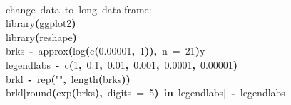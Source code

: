 \documentclass[a4paper]{article}
\newcommand{\hlnumber}[1]{\textcolor[rgb]{0.0823529411764706,0.0784313725490196,0.709803921568627}{#1}}%
\newcommand{\hlfunctioncall}[1]{\textcolor[rgb]{1,0,0}{#1}}%
\newcommand{\hlstring}[1]{\textcolor[rgb]{0.6,0.6,1}{#1}}%
\newcommand{\hlkeyword}[1]{\textcolor[rgb]{0,0,0}{\textbf{#1}}}%
\newcommand{\hlargument}[1]{\textcolor[rgb]{0.694117647058824,0.247058823529412,0.0196078431372549}{#1}}%
\newcommand{\hlcomment}[1]{\textcolor[rgb]{0.8,0.8,0.8}{#1}}%
\newcommand{\hlassignement}[1]{\textcolor[rgb]{0.215686274509804,0.215686274509804,0.384313725490196}{\textbf{#1}}}%
\newcommand{\hlsymbol}[1]{\textcolor[rgb]{0,0,0}{#1}}%
\newcommand{\hlprompt}[1]{\textcolor[rgb]{0,0,0}{#1}}%
\newcommand{\hlstd}[1]{\textcolor[rgb]{0,0,0}{#1}}%
\newenvironment{Houtput}{\raggedright}{%
%
}
\begin{document}
\begin{Houtput}
\hspace*{\fill}\\
\hlstd{}\ttfamily\noindent
\hlprompt{\usebox{\hlnormalsizeboxgreaterthan}{\ }}\hlcomment{\usebox{\hlnormalsizeboxhash}{\ }change{\ }data{\ }to{\ }long{\ }data.frame:}\mbox{}
\normalfont
\hspace*{\fill}\\
\hlstd{}\ttfamily\noindent
\hlprompt{\usebox{\hlnormalsizeboxgreaterthan}{\ }}\hlfunctioncall{library}\hlkeyword{(}\hlsymbol{ggplot2}\hlkeyword{)}\mbox{}
\normalfont
\hspace*{\fill}\\
\hlstd{}\ttfamily\noindent
\hlprompt{\usebox{\hlnormalsizeboxgreaterthan}{\ }}\hlfunctioncall{library}\hlkeyword{(}\hlsymbol{reshape}\hlkeyword{)}\mbox{}
\normalfont
\hspace*{\fill}\\
\hlstd{}\ttfamily\noindent
\hlprompt{\usebox{\hlnormalsizeboxgreaterthan}{\ }}\hlsymbol{brks}{\ }\hlassignement{\usebox{\hlnormalsizeboxlessthan}-}{\ }\hlfunctioncall{approx}\hlkeyword{(}\hlfunctioncall{log}\hlkeyword{(}\hlfunctioncall{c}\hlkeyword{(}\hlnumber{0.00001}\hlkeyword{,}{\ }\hlnumber{1}\hlkeyword{)}\hlkeyword{)}\hlkeyword{,}{\ }\hlargument{n}{\ }\hlargument{=}{\ }\hlnumber{21}\hlkeyword{)}\hlkeyword{\usebox{\hlnormalsizeboxdollar}}\hlsymbol{y}\mbox{}
\normalfont
\hspace*{\fill}\\
\hlstd{}\ttfamily\noindent
\hlprompt{\usebox{\hlnormalsizeboxgreaterthan}{\ }}\hlsymbol{legendlabs}{\ }\hlassignement{\usebox{\hlnormalsizeboxlessthan}-}{\ }\hlfunctioncall{c}\hlkeyword{(}\hlnumber{1}\hlkeyword{,}{\ }\hlnumber{0.1}\hlkeyword{,}{\ }\hlnumber{0.01}\hlkeyword{,}{\ }\hlnumber{0.001}\hlkeyword{,}{\ }\hlnumber{0.0001}\hlkeyword{,}{\ }\hlnumber{0.00001}\hlkeyword{)}\mbox{}
\normalfont
\hspace*{\fill}\\
\hlstd{}\ttfamily\noindent
\hlprompt{\usebox{\hlnormalsizeboxgreaterthan}{\ }}\hlsymbol{brkl}{\ }\hlassignement{\usebox{\hlnormalsizeboxlessthan}-}{\ }\hlfunctioncall{rep}\hlkeyword{(}\hlstring{""}\hlkeyword{,}{\ }\hlfunctioncall{length}\hlkeyword{(}\hlsymbol{brks}\hlkeyword{)}\hlkeyword{)}\mbox{}
\normalfont
\hspace*{\fill}\\
\hlstd{}\ttfamily\noindent
\hlprompt{\usebox{\hlnormalsizeboxgreaterthan}{\ }}\hlsymbol{brkl}\hlkeyword{[}\hlfunctioncall{round}\hlkeyword{(}\hlfunctioncall{exp}\hlkeyword{(}\hlsymbol{brks}\hlkeyword{)}\hlkeyword{,}{\ }\hlargument{digits}{\ }\hlargument{=}{\ }\hlnumber{5}\hlkeyword{)}{\ }\hlkeyword{\usebox{\hlnormalsizeboxpercent}in\usebox{\hlnormalsizeboxpercent}}{\ }\hlsymbol{legendlabs}\hlkeyword{]}{\ }\hlassignement{\usebox{\hlnormalsizeboxlessthan}-}{\ }\hlsymbol{legendlabs}\mbox{}

\end{Houtput}
\end{document}
